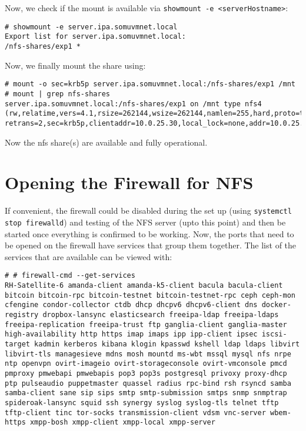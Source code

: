 \noindent
Now, we check if the mount is available via \verb|showmount -e <serverHostname>|:

\vspace{-15pt}
\begin{verbatim}
# showmount -e server.ipa.somuvmnet.local
Export list for server.ipa.somuvmnet.local:
/nfs-shares/exp1 *
\end{verbatim}
\vspace{-10pt}	

\noindent
Now, we finally mount the share using:

\vspace{-15pt}
\begin{verbatim}
# mount -o sec=krb5p server.ipa.somuvmnet.local:/nfs-shares/exp1 /mnt
# mount | grep nfs-shares
server.ipa.somuvmnet.local:/nfs-shares/exp1 on /mnt type nfs4 (rw,relatime,vers=4.1,rsize=262144,wsize=262144,namlen=255,hard,proto=tcp,port=0,timeo=600, retrans=2,sec=krb5p,clientaddr=10.0.25.30,local_lock=none,addr=10.0.25.25)
\end{verbatim}
\vspace{-10pt}	

\noindent
Now the nfs share(s) are available and fully operational. 

\section{Opening the Firewall for NFS}
If convenient, the firewall could be disabled during the set up (using \verb|systemctl stop firewalld|) and testing of the NFS server (upto this point) and then be started once everything is confirmed to be working. Now, the ports that need to be opened on the firewall have services that group them together. The list of the services that are available can be viewed with:


\vspace{-15pt}
\begin{verbatim}
# # firewall-cmd --get-services 
RH-Satellite-6 amanda-client amanda-k5-client bacula bacula-client bitcoin bitcoin-rpc bitcoin-testnet bitcoin-testnet-rpc ceph ceph-mon cfengine condor-collector ctdb dhcp dhcpv6 dhcpv6-client dns docker-registry dropbox-lansync elasticsearch freeipa-ldap freeipa-ldaps freeipa-replication freeipa-trust ftp ganglia-client ganglia-master high-availability http https imap imaps ipp ipp-client ipsec iscsi-target kadmin kerberos kibana klogin kpasswd kshell ldap ldaps libvirt libvirt-tls managesieve mdns mosh mountd ms-wbt mssql mysql nfs nrpe ntp openvpn ovirt-imageio ovirt-storageconsole ovirt-vmconsole pmcd pmproxy pmwebapi pmwebapis pop3 pop3s postgresql privoxy proxy-dhcp ptp pulseaudio puppetmaster quassel radius rpc-bind rsh rsyncd samba samba-client sane sip sips smtp smtp-submission smtps snmp snmptrap spideroak-lansync squid ssh synergy syslog syslog-tls telnet tftp tftp-client tinc tor-socks transmission-client vdsm vnc-server wbem-https xmpp-bosh xmpp-client xmpp-local xmpp-server
\end{verbatim}
\vspace{-10pt}	

